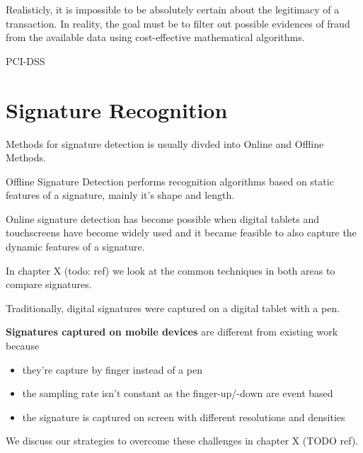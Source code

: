 \documentclass[a4paper, oneside]{csthesis}
\begin{document}
Realisticly, it is impossible to be absolutely certain about the legitimacy of a transaction. In reality, the goal must be to filter out possible evidences of fraud from the available data using cost-effective mathematical algorithms.


PCI-DSS






\section{Signature Recognition}

Methods for signature detection is usually divded into Online and Offline Methods.

Offline Signature Detection performs recognition algorithms based on static features of a signature, mainly it's shape and length.

Online signature detection has become possible when digital tablets and touchscreens have become widely used and it became feasible to also capture the dynamic features of a signature.

In chapter X (todo: ref) we look at the common techniques in both areas to compare signatures.

Traditionally, digital signatures were captured on a digital tablet with a pen.

\textbf{Signatures captured on mobile devices} are different from existing work because

\begin{itemize}
    \item they're capture by finger instead of a pen
    \item the sampling rate isn't constant as the finger-up/-down are event based
    \item the signature is captured on screen with different resolutions and densities
\end{itemize}

We discuss our strategies to overcome these challenges in chapter X (TODO ref).


\end{document}
